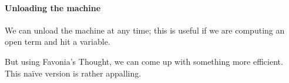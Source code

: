 \documentclass{article}
\newcommand\Env[2]{#1\star{#2}}
\newcommand\Clo[3]{#1\triangleleft{\Env{#2}{#3}}}
\newcommand\Cons[2]{{#1}\dblcolon{#2}}
\newcommand\Frame[4]{\perfectparens{#1,\Env{#2}{#3},#4}}
\newcommand\Cfg[4]{\cut{\Clo{#1}{#2}{#3}}{#4}}
\newcommand\EE{\mathcal{E}}
\begin{document}
\paragraph{Unloading the machine}

We can unload the machine at any time; this is useful if we are
computing an open term and hit a variable.


But using Favonia's Thought, we can come up with something more
efficient. This na\"ive version is rather appalling.
\end{document}
